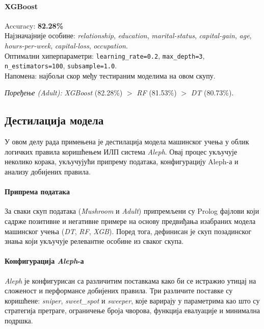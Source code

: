 \paragraph{XGBoost}
Accuracy: \textbf{82.28\%}\\
Најзначајније особине: \textit{relationship}, \textit{education}, \textit{marital-status}, \textit{capital-gain}, \textit{age}, \textit{hours-per-week}, \textit{capital-loss}, \textit{occupation}.\\
Оптимални хиперпараметри: \texttt{learning\_rate=0.2}, \texttt{max\_depth=3}, \texttt{n\_estimators=100}, \texttt{subsample=1.0}.\\
Напомена: најбољи скор међу тестираним моделима на овом скупу.

\medskip
\noindent\textit{Поређење (Adult):} \textit{XGBoost} (82.28\%) $>$ \textit{RF} (81.53\%) $>$ \textit{DT} (80.73\%).


\subsection{Дестилација модела}

У овом делу рада примењена је дестилација модела машинског учења у облик логичких правила коришћењем ИЛП система \emph{Aleph}. Овај процес укључује неколико корака, укључујући припрему података, конфигурацију Aleph-а и анализу добијених правила.

\paragraph{Припрема података} За сваки скуп података (\emph{Mushroom} и \emph{Adult}) припремљени су Prolog фајлови који садрже позитивне и негативне примере на основу предвиђања изабраних модела машинског учења (\textit{DT}, \textit{RF}, \textit{XGB}). Поред тога, дефинисан је скуп позадинског знања који укључује релевантне особине из сваког скупа.

\paragraph{Конфигурација \emph{Aleph}-а} \emph{Aleph} је конфигурисан са различитим поставкама како би се истражио утицај на сложеност и перформансе добијених правила. Три различите поставке су коришћене: \textit{sniper}, \textit{sweet\_spot} и \textit{sweeper}, које варирају у параметрима као што су стратегија претраге, ограничење броја чворова, функција евалуације и минимална подршка.


